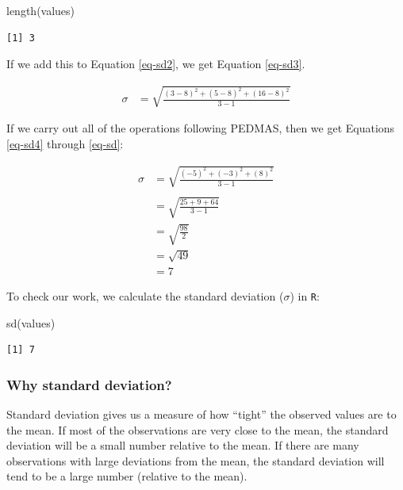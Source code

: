 \documentclass[
  letterpaper,
  DIV=11,
  numbers=noendperiod]{scrartcl}
\newenvironment{Shaded}{\begin{snugshade}}{\end{snugshade}}
\newcommand{\FunctionTok}[1]{\textcolor[rgb]{0.28,0.35,0.67}{#1}}
\newcommand{\NormalTok}[1]{\textcolor[rgb]{0.00,0.23,0.31}{#1}}
\begin{document}
\begin{Shaded}
\begin{Highlighting}[]
\FunctionTok{length}\NormalTok{(values)}
\end{Highlighting}
\end{Shaded}

\begin{verbatim}
[1] 3
\end{verbatim}

If we add this to Equation \ref{eq-sd2}, we get Equation \ref{eq-sd3}.

\begin{align}
\sigma & = \sqrt{\frac{(3-8)^2 + (5-8)^2 + (16-8)^2}{3-1}} \label{eq-sd3}
\end{align}

If we carry out all of the operations following PEDMAS, then we get
Equations \ref{eq-sd4} through \ref{eq-sd}:

\begin{align}
\sigma & = \sqrt{\frac{(-5)^2 + (-3)^2 + (8)^2}{3-1}} \\ \label{eq-sd4}
\\
& = \sqrt{\frac{25 + 9 + 64}{3-1}}
\\
& = \sqrt{\frac{98}{2}} \\
& = \sqrt{49} \\
& = 7
\end{align}

To check our work, we calculate the standard deviation (\(\sigma\)) in
\texttt{R}:

\begin{Shaded}
\begin{Highlighting}[]
\FunctionTok{sd}\NormalTok{(values)}
\end{Highlighting}
\end{Shaded}

\begin{verbatim}
[1] 7
\end{verbatim}

\hypertarget{why-standard-deviation}{%
\subsubsection{Why standard deviation?}\label{why-standard-deviation}}

Standard deviation gives us a measure of how ``tight'' the observed
values are to the mean. If most of the observations are very close to
the mean, the standard deviation will be a small number relative to the
mean. If there are many observations with large deviations from the
mean, the standard deviation will tend to be a large number (relative to
the mean).
\end{document}
